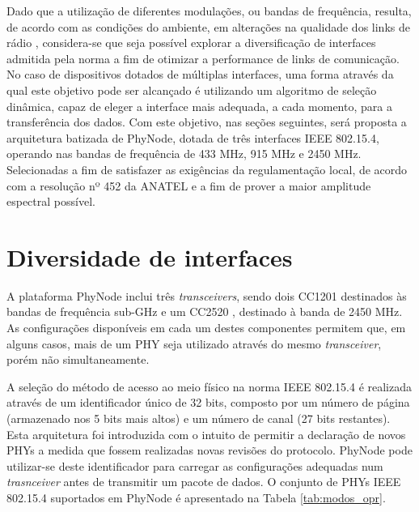 \documentclass{article}
\begin{document}
	Dado que a utilização de diferentes modulações, ou bandas de frequência, resulta, de acordo com as condições do ambiente, em alterações na qualidade dos links de rádio \cite{bibid}, considera-se que seja possível explorar a diversificação de interfaces admitida pela norma a fim de otimizar a performance de links de comunicação. No caso de dispositivos dotados de múltiplas interfaces, uma forma através da qual este objetivo pode ser alcançado é utilizando um algoritmo de seleção dinâmica, capaz de eleger a interface mais adequada, a cada momento, para a transferência dos dados. Com este objetivo, nas seções seguintes, será proposta a arquitetura batizada de PhyNode, dotada de três interfaces IEEE 802.15.4, operando nas bandas de frequência de 433 MHz, 915 MHz e 2450 MHz. Selecionadas a fim de satisfazer as exigências da regulamentação local, de acordo com a resolução nº 452 da ANATEL \cite{bibid} e a fim de prover a maior amplitude espectral possível.

\section{Diversidade de interfaces}	
	A plataforma PhyNode inclui três \textit{transceivers}, sendo dois CC1201 \cite{bibid} destinados às bandas de frequência sub-GHz e um CC2520 \cite{bibid}, destinado à banda de 2450 MHz. As configurações disponíveis em cada um destes componentes permitem que, em alguns casos, mais de um PHY seja utilizado através do mesmo \textit{transceiver}, porém  não simultaneamente.
	
	A seleção do método de acesso ao meio físico na norma IEEE 802.15.4 é realizada através de um identificador único de 32 bits, composto por um número de página (armazenado nos 5 bits mais altos) e um número de canal (27 bits restantes). Esta arquitetura foi introduzida com o intuito de permitir a declaração de novos PHYs a medida que fossem realizadas novas revisões do protocolo. PhyNode pode utilizar-se deste identificador para carregar as configurações adequadas num \textit{trasnceiver} antes de transmitir um pacote de dados. O conjunto de PHYs IEEE 802.15.4 suportados em PhyNode é apresentado na Tabela \ref{tab:modos_opr}.
	
\end{document}
